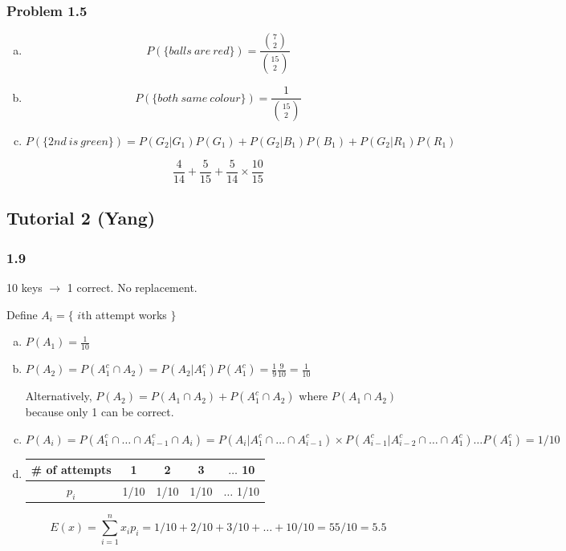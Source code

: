 \documentclass{report}
\begin{document}
\subsubsection*{Problem 1.5}

\begin{enumerate}[(a)]

\item $$P(\{ balls\ are\ red\}) = \frac{{7 \choose 2}}{{15 \choose 2}}$$

\item $$P(\{ both\ same\ colour\}) = \frac{1}{{15 \choose 2}}$$

\item $$P(\{ 2nd\ is\ green\})  = P(G_2 | G_1)P(G_1) + P(G_2|B_1)P(B_1) + P(G_2|R_1)P(R_1)$$

$$\frac{4}{14} + \frac{5}{15} + \frac{5}{14} \times \frac{10}{15}$$

\end{enumerate}



\subsection{Tutorial 2 (Yang)}

\subsubsection*{1.9}

10 keys $\rightarrow$ 1 correct. No replacement.

Define $A_i = \{ $ $i$th attempt works $\}$

\begin{enumerate}[(a)]
\item $P(A_1) = \frac{1}{10}$
\item $P(A_2) = P(A_1^c \cap A_2) = P(A_2|A_1^c) P(A_1^c) = \frac{1}{9} \frac{9}{10} = \frac{1}{10}$

Alternatively, $P(A_2) = P(A_1 \cap A_2) + P(A_1^c \cap A_2)$ where $P(A_1 \cap A_2)$ because only 1 can be correct.

\item $P(A_i) = P(A_1^c \cap \dots \cap A_{i-1}^c \cap A_i) = P(A_i | A_1^c \cap \dots \cap A_{i-1}^c) \times P(A_{i-1}^c | A_{i-2}^c \cap \dots \cap A_{1}^c) \dots P(A_1^c) = 1/10$

\item 

\begin{table}[H]
\centering
\begin{tabular}{c|cccc}
\toprule
\# of attempts & 1 & 2 & 3 & $\dots$ 10 \\
\midrule
$p_i$ & 1/10 & 1/10 & 1/10 & $\dots$ 1/10 \\
\bottomrule
\end{tabular}
\end{table}

$$
E(x) = \sum_{i=1}^n x_i p_i = 1/10 + 2/10 + 3/10 + \dots + 10/10 = 55/10 = 5.5
$$



\end{enumerate}
\end{document}
